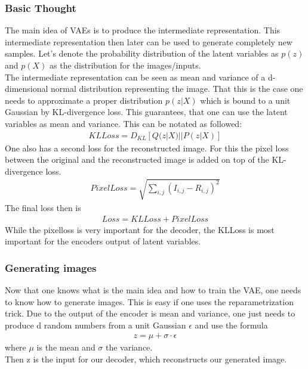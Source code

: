 \documentclass[
     11pt,         %
     a4paper,      %
     oneside,
     ]{article}
\begin{document}
\subsubsection{Basic Thought}
The main idea of VAEs is to produce the intermediate representation. This intermediate representation then later can be used to generate completely new samples. Let's denote the probability distribution of the latent variables as $p(z)$ and $p(X)$ as the distribution for the images/inputs. \\
The intermediate representation can be seen as mean and variance of a d-dimensional normal distribution representing the image.
That this is the case one needs to approximate a proper distribution $p(z|X)$ which is bound to a unit Gaussian by KL-divergence loss. This guarantees, that one can use the latent variables as mean and variance. This can be notated as followed:
\begin{align*}
  KLLoss = D_{KL}[Q(z|X)||P(z|X)]
\end{align*}
One also has a second loss for the reconstructed image. For this the pixel loss between the original and the reconstructed image is added on top of the KL-divergence loss.
\begin{align*}
  PixelLoss = \sqrt{\sum_{i,j} (I_{i,j} - R_{i,j})^2}
\end{align*}
The final loss then is
\begin{align*}
  Loss = KLLoss + PixelLoss
\end{align*}
While the pixelloss is very important for the decoder, the KLLoss is most important for the encoders output of latent variables.\cite{VAE2}\cite{VAE}
\subsubsection{Generating images}
Now that one knows what is the main idea and how to train the VAE, one needs to know how to generate images. This is easy if one uses the reparametrization trick. Due to the output of the encoder is mean and variance, one just needs to produce d random numbers from a unit Gaussian $\epsilon$ and use the formula
\begin{align*}
  z = \mu + \sigma \cdot \epsilon
\end{align*}
where $\mu$ is the mean and $\sigma$ the variance.\\
Then z is the input for our decoder, which reconstructs our generated image.\cite{VAE2}\cite{VAE}
\end{document}
